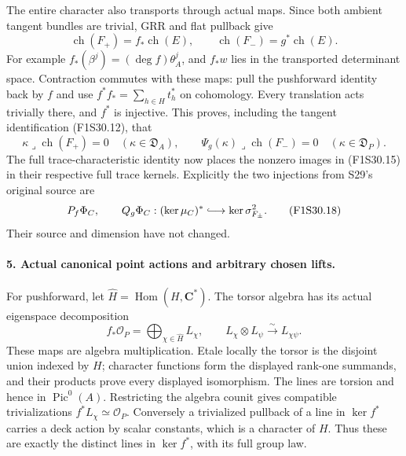 The entire character also transports through
actual maps. Since both ambient tangent bundles
are trivial, GRR and flat pullback give
\[
           \operatorname{ch}(F_+)=f_*\operatorname{ch}(E),
        \qquad \operatorname{ch}(F_-)=g^*\operatorname{ch}(E).
 \tag{F1S30.16}
\]
For example $f_*(\beta^j)=(\deg f)\theta_A^j$,
and $f_*w$ lies in the transported determinant
space. Contraction commutes with these maps:
pull the pushforward identity back by $f$ and
use $f^*f_*=\sum_{h\in H}t_h^*$ on cohomology.
Every translation acts trivially there, and
$f^*$ is injective. This proves, including
the tangent identification (F1S30.12), that
\[
  \kappa\mathbin{\lrcorner}\operatorname{ch}(F_+)=0
        \quad(\kappa\in\mathfrak D_A),
 \qquad
  \Psi_g(\kappa)\mathbin{\lrcorner}\operatorname{ch}(F_-)=0
        \quad(\kappa\in\mathfrak D_P).
 \tag{F1S30.17}
\]
The full trace-characteristic identity now
places the nonzero images in (F1S30.15) in
their respective full trace kernels. Explicitly
the two injections from S29's original source are
\[
                P_f\Phi_C,\qquad Q_g\Phi_C:
             (\ker\mu_C)^*\lhook\joinrel\longrightarrow
                                 \ker\sigma^2_{F_\pm}.
 \tag{F1S30.18}
\]
Their source and dimension have not changed.

\paragraph{5. Actual canonical point actions and arbitrary chosen lifts.}
For pushforward, let $\widehat H=\operatorname{Hom}(H,\mathbf C^*)$.
The torsor algebra has its actual eigenspace decomposition
\[
          f_*\mathcal O_P=\bigoplus_{\chi\in\widehat H}L_\chi,
             \qquad L_\chi\otimes L_\psi
                          \xrightarrow{\sim}L_{\chi\psi}.
 \tag{F1S30.19}
\]
These maps are algebra multiplication. Etale locally
the torsor is the disjoint union indexed by $H$;
character functions form the displayed rank-one
summands, and their products prove every displayed
isomorphism. The lines are torsion and hence in
$\operatorname{Pic}^0(A)$. Restricting the algebra
counit gives compatible trivializations
$f^*L_\chi\simeq\mathcal O_P$.
Conversely a trivialized pullback of a line in
$\ker f^*$ carries a deck action by scalar constants,
which is a character of $H$. Thus these are exactly
the distinct lines in $\ker f^*$, with its full
group law.


